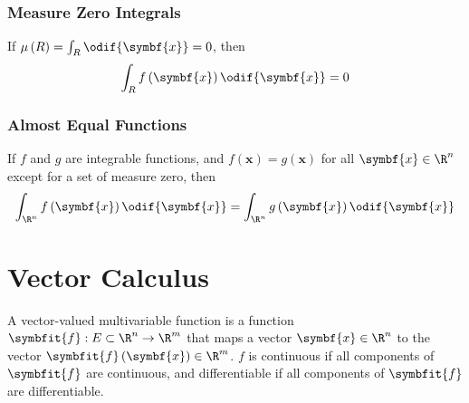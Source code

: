 \documentclass{article}
\begin{document}
\subsubsection*{Measure Zero Integrals}
If \(\mu\left( R \right) = \int_R \odif{\symbf{x}} = 0\), then
\begin{equation*}
    \int_R f\left( \symbf{x} \right) \odif{\symbf{x}} = 0
\end{equation*}
\subsubsection*{Almost Equal Functions}
If \(f\) and \(g\) are integrable functions, and \(f\left( \symbf{x}
\right) = g\left( \symbf{x} \right)\) for all \(\symbf{x} \in \R^n\)
except for a set of measure zero, then
\begin{equation*}
    \int_{\R^n} f\left( \symbf{x} \right) \odif{\symbf{x}} = \int_{\R^n} g\left( \symbf{x} \right) \odif{\symbf{x}}
\end{equation*}
\section{Vector Calculus}
A vector-valued multivariable function is a function \(\symbfit{f} : E
\subset \R^n \to \R^m\) that maps a vector \(\symbf{x} \in \R^n\) to
the vector \(\symbfit{f}\left( \symbf{x} \right) \in \R^m\). \(f\) is
continuous if all components of \(\symbfit{f}\) are continuous, and
differentiable if all components of \(\symbfit{f}\) are differentiable.
\end{document}

